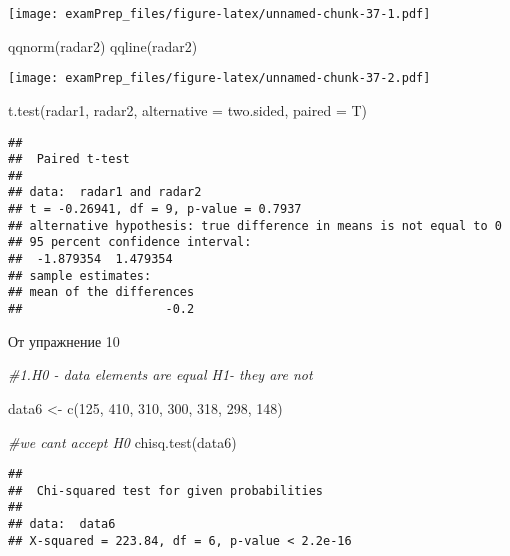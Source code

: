 \documentclass[
]{article}
\newenvironment{Shaded}{\begin{snugshade}}{\end{snugshade}}
\newcommand{\AttributeTok}[1]{\textcolor[rgb]{0.77,0.63,0.00}{#1}}
\newcommand{\CommentTok}[1]{\textcolor[rgb]{0.56,0.35,0.01}{\textit{#1}}}
\newcommand{\DecValTok}[1]{\textcolor[rgb]{0.00,0.00,0.81}{#1}}
\newcommand{\FunctionTok}[1]{\textcolor[rgb]{0.00,0.00,0.00}{#1}}
\newcommand{\NormalTok}[1]{#1}
\newcommand{\OtherTok}[1]{\textcolor[rgb]{0.56,0.35,0.01}{#1}}
\newcommand{\StringTok}[1]{\textcolor[rgb]{0.31,0.60,0.02}{#1}}
\begin{document}
\texttt{[image: examPrep\_files/figure-latex/unnamed-chunk-37-1.pdf]}

\begin{Shaded}
\begin{Highlighting}[]
\FunctionTok{qqnorm}\NormalTok{(radar2)}
\FunctionTok{qqline}\NormalTok{(radar2)}
\end{Highlighting}
\end{Shaded}

\texttt{[image: examPrep\_files/figure-latex/unnamed-chunk-37-2.pdf]}

\begin{Shaded}
\begin{Highlighting}[]
\FunctionTok{t.test}\NormalTok{(radar1, radar2, }\AttributeTok{alternative =} \StringTok{\textquotesingle{}two.sided\textquotesingle{}}\NormalTok{, }\AttributeTok{paired =}\NormalTok{ T)}
\end{Highlighting}
\end{Shaded}

\begin{verbatim}
## 
##  Paired t-test
## 
## data:  radar1 and radar2
## t = -0.26941, df = 9, p-value = 0.7937
## alternative hypothesis: true difference in means is not equal to 0
## 95 percent confidence interval:
##  -1.879354  1.479354
## sample estimates:
## mean of the differences 
##                    -0.2
\end{verbatim}

От упражнение 10

\begin{Shaded}
\begin{Highlighting}[]
\CommentTok{\#1.H0 {-} data elements are equal H1{-} they are not}

\NormalTok{data6 }\OtherTok{\textless{}{-}} \FunctionTok{c}\NormalTok{(}\DecValTok{125}\NormalTok{, }\DecValTok{410}\NormalTok{, }\DecValTok{310}\NormalTok{, }\DecValTok{300}\NormalTok{, }\DecValTok{318}\NormalTok{, }\DecValTok{298}\NormalTok{, }\DecValTok{148}\NormalTok{)}

\CommentTok{\#we cant accept H0}
\FunctionTok{chisq.test}\NormalTok{(data6)}
\end{Highlighting}
\end{Shaded}

\begin{verbatim}
## 
##  Chi-squared test for given probabilities
## 
## data:  data6
## X-squared = 223.84, df = 6, p-value < 2.2e-16
\end{verbatim}
\end{document}
